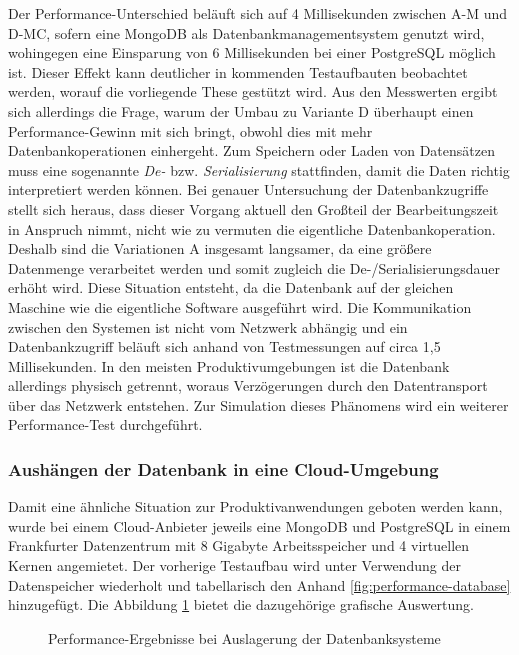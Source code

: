 Der Performance-Unterschied beläuft sich auf 4 Millisekunden zwischen A-M und D-MC, sofern eine MongoDB als Datenbankmanagementsystem genutzt wird, wohingegen eine Einsparung von 6 Millisekunden bei einer PostgreSQL möglich ist. Dieser Effekt kann deutlicher in kommenden Testaufbauten beobachtet werden, worauf die vorliegende These gestützt wird. Aus den Messwerten ergibt sich allerdings die Frage, warum der Umbau zu Variante D überhaupt einen Performance-Gewinn mit sich bringt, obwohl dies mit mehr Datenbankoperationen einhergeht. Zum Speichern oder Laden von Datensätzen muss eine sogenannte \emph{De-} bzw. \emph{\Gls{Serialisierung}} stattfinden, damit die Daten richtig interpretiert werden können. Bei genauer Untersuchung der Datenbankzugriffe stellt sich heraus, dass dieser Vorgang aktuell den Großteil der Bearbeitungszeit in Anspruch nimmt, nicht wie zu vermuten die eigentliche Datenbankoperation. Deshalb sind die Variationen A insgesamt langsamer, da eine größere Datenmenge verarbeitet werden und somit zugleich die De-/Serialisierungsdauer erhöht wird. Diese Situation entsteht, da die Datenbank auf der gleichen Maschine wie die eigentliche Software ausgeführt wird. Die Kommunikation zwischen den Systemen ist nicht vom Netzwerk abhängig und ein Datenbankzugriff beläuft sich anhand von Testmessungen auf circa 1,5 Millisekunden. In den meisten Produktivumgebungen ist die Datenbank allerdings physisch getrennt, woraus Verzögerungen durch den Datentransport über das Netzwerk entstehen. Zur Simulation dieses Phänomens wird ein weiterer Performance-Test durchgeführt. 

\subsubsection{Aushängen der Datenbank in eine Cloud-Umgebung}

Damit eine ähnliche Situation zur Produktivanwendungen geboten werden kann, wurde bei einem Cloud-Anbieter jeweils eine MongoDB und PostgreSQL in einem Frankfurter Datenzentrum mit 8 Gigabyte Arbeitsspeicher und 4 virtuellen Kernen angemietet. Der vorherige Testaufbau wird unter Verwendung der Datenspeicher wiederholt und tabellarisch den Anhand \ref{fig:performance-database} hinzugefügt. Die Abbildung \ref{fig:PerformanceDatabase} bietet die dazugehörige grafische Auswertung.

\begin{figure}[htpb]
	\centering
	\footnotesize
	
	\caption{Performance-Ergebnisse bei Auslagerung der Datenbanksysteme}
	\label{fig:PerformanceDatabase}
\end{figure}

